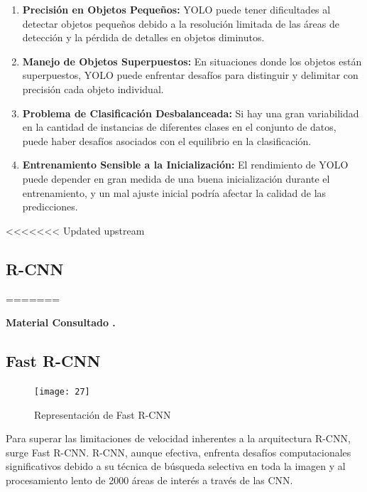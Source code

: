 	\begin{enumerate}
		\item \textbf{Precisión en Objetos Pequeños:} YOLO puede tener dificultades al detectar objetos pequeños debido a la resolución limitada de las áreas de detección y la pérdida de detalles en objetos diminutos.
    
    	\item \textbf{Manejo de Objetos Superpuestos:} En situaciones donde los objetos están superpuestos, YOLO puede enfrentar desafíos para distinguir y delimitar con precisión cada objeto individual.
    
   	 	\item \textbf{Problema de Clasificación Desbalanceada:} Si hay una gran variabilidad en la cantidad de instancias de diferentes clases en el conjunto de datos, puede haber desafíos asociados con el equilibrio en la clasificación.
    
    	\item \textbf{Entrenamiento Sensible a la Inicialización:} El rendimiento de YOLO puede depender en gran medida de una buena inicialización durante el entrenamiento, y un mal ajuste inicial podría afectar la calidad de las predicciones.	
	
	\end{enumerate}
	
	


	

<<<<<<< Updated upstream
	\subsection{R-CNN}
=======

     \begin{flushright}
        \textbf{Material Consultado \cite{filminasleo}.}
    \end{flushright}

	\subsection{Fast R-CNN}

	\begin{figure} 
	    \centering
		\texttt{[image: 27]}
		\caption{Representación de Fast R-CNN}
	\end{figure}
 
	Para superar las limitaciones de velocidad inherentes a la arquitectura R-CNN, surge Fast R-CNN. R-CNN, aunque efectiva, enfrenta desafíos computacionales significativos debido a su técnica de búsqueda selectiva en toda la imagen y al procesamiento lento de 2000 áreas de interés a través de las CNN.
 
